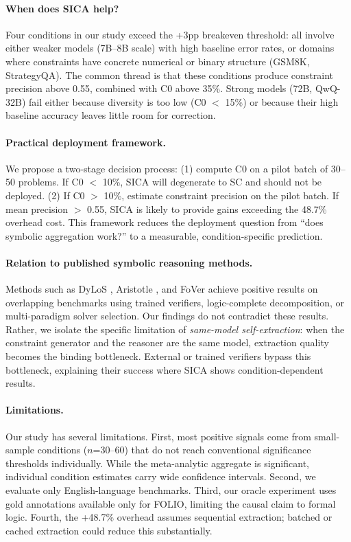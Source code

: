 \documentclass[11pt,a4paper]{article}
\begin{document}
\paragraph{When does SICA help?}
Four conditions in our study exceed the +3pp breakeven threshold: all involve either weaker models (7B--8B scale) with high baseline error rates, or domains where constraints have concrete numerical or binary structure (GSM8K, StrategyQA). The common thread is that these conditions produce constraint precision above 0.55, combined with C0 above 35\%. Strong models (72B, QwQ-32B) fail either because diversity is too low (C0 $<$ 15\%) or because their high baseline accuracy leaves little room for correction.

\paragraph{Practical deployment framework.}
We propose a two-stage decision process: (1) compute C0 on a pilot batch of 30--50 problems. If C0 $<$ 10\%, SICA will degenerate to SC and should not be deployed. (2) If C0 $>$ 10\%, estimate constraint precision on the pilot batch. If mean precision $>$ 0.55, SICA is likely to provide gains exceeding the 48.7\% overhead cost. This framework reduces the deployment question from ``does symbolic aggregation work?'' to a measurable, condition-specific prediction.

\paragraph{Relation to published symbolic reasoning methods.}
Methods such as DyLoS \citep{dylos2026}, Aristotle \citep{aristotle2025}, and FoVer \citep{fover2025} achieve positive results on overlapping benchmarks using trained verifiers, logic-complete decomposition, or multi-paradigm solver selection. Our findings do not contradict these results. Rather, we isolate the specific limitation of \emph{same-model self-extraction}: when the constraint generator and the reasoner are the same model, extraction quality becomes the binding bottleneck. External or trained verifiers bypass this bottleneck, explaining their success where SICA shows condition-dependent results.

\paragraph{Limitations.}
Our study has several limitations. First, most positive signals come from small-sample conditions ($n$=30--60) that do not reach conventional significance thresholds individually. While the meta-analytic aggregate is significant, individual condition estimates carry wide confidence intervals. Second, we evaluate only English-language benchmarks. Third, our oracle experiment uses gold annotations available only for FOLIO, limiting the causal claim to formal logic. Fourth, the +48.7\% overhead assumes sequential extraction; batched or cached extraction could reduce this substantially.
\end{document}
